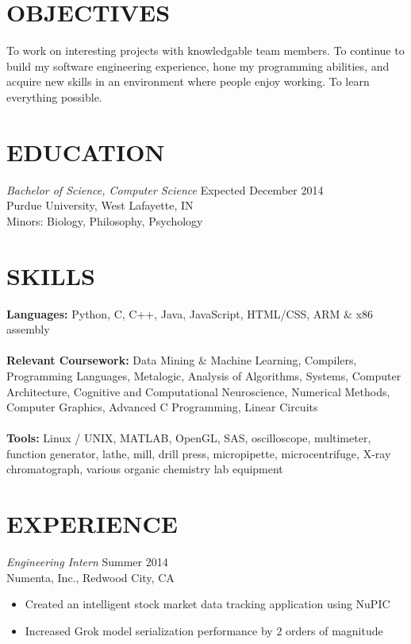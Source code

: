 \documentclass[margin,5pt]{res} %
\begin{document}
\address{vsinha@purdue.edu\\ vsinha.com \\github.com/vsinha}
\address{217 Pierce St. Unit 2 \\ West Lafayette, IN 47906\\(408) 505-1275}


\begin{resume}

 
\section{OBJECTIVES}To work on interesting projects with knowledgable team members. To continue to build
my software engineering experience, hone my programming abilities, and acquire new skills
in an environment where people enjoy working. To learn everything possible.

 

\section{EDUCATION} {\sl Bachelor of Science, Computer Science }\hfill Expected December 2014\\
               	 	    Purdue University, West Lafayette, IN\\
                	 	    Minors: Biology, Philosophy,  Psychology 
 

\section{SKILLS} {\bf Languages:} Python, C, C++, Java, JavaScript, HTML/CSS, ARM \& x86 assembly\\ \\
 		      {\bf Relevant Coursework:} Data Mining \& Machine Learning, Compilers, Programming Languages, Metalogic, Analysis of Algorithms, 
							Systems, Computer Architecture, Cognitive and Computational Neuroscience,
							Numerical Methods, Computer Graphics, Advanced C Programming, Linear Circuits\\ \\
		      {\bf Tools:} Linux / UNIX, MATLAB, OpenGL, SAS, oscilloscope, multimeter, function generator, lathe, mill, drill press, 
					micropipette, microcentrifuge, X-ray chromatograph, various organic chemistry lab equipment
 

\section{EXPERIENCE} {\sl Engineering Intern} \hfill Summer 2014\\
               Numenta, Inc., Redwood City, CA
                \begin{itemize} \itemsep -2pt
                \item Created an intelligent stock market data tracking application using NuPIC
                \item Increased Grok model serialization performance by 2 orders of magnitude
	       \end{itemize}



\end{resume}
\end{document}
